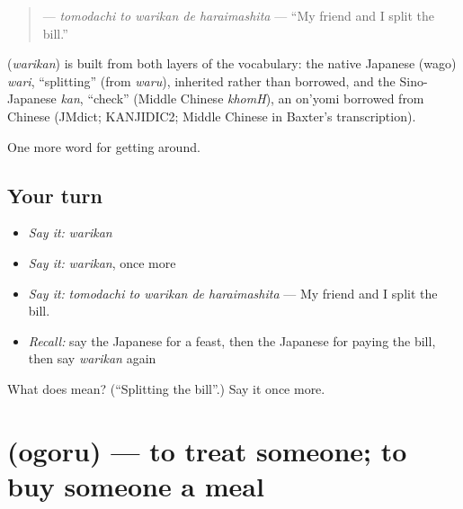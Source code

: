 \begin{quote}
\textbf{  } — \emph{tomodachi to warikan de haraimashita} — \textquotedblleft{}My friend and I split the bill.\textquotedblright{}
\end{quote}

\begin{cousinweb}
\textbf{} (\emph{warikan}) is built from both layers of the vocabulary: the native Japanese (wago) \emph{wari}, \textquotedblleft{}splitting\textquotedblright{} (from \emph{waru}), inherited rather than borrowed, and the Sino-Japanese \emph{kan}, \textquotedblleft{}check\textquotedblright{} (Middle Chinese \emph{khomH}), an on'yomi borrowed from Chinese (JMdict; KANJIDIC2; Middle Chinese in Baxter's transcription).
\end{cousinweb}

\begin{grammarlens}[title={What you've built}]
One more word for getting around.
\end{grammarlens}

\subsection*{Your turn}
\begin{itemize}
\raggedright
  \item \emph{Say it:} \emph{warikan}
  \item \emph{Say it:} \emph{warikan}, once more
  \item \emph{Say it:} \emph{tomodachi to warikan de haraimashita} — My friend and I split the bill.
  \item \emph{Recall:} say the Japanese for a feast, then the Japanese for paying the bill, then say \emph{warikan} again
\end{itemize}

\begin{tcolorbox}[breakable,colback=teal!4,colframe=teal!35!black,title={Before you move on}]
What does  mean? (\textquotedblleft{}Splitting the bill\textquotedblright{}.) Say it once more.
\end{tcolorbox}
\section[\texorpdfstring{\ja{おごる} (ogoru)}{おごる (ogoru)}]{ (ogoru) — to treat someone; to buy someone a meal}

\label{lesson:JA-C423-ogoru}



